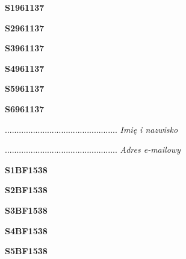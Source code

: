 \begin{turn}{90}\huge \textbf{S1961137}\end{turn}

\begin{turn}{90}\huge \textbf{S2961137}\end{turn}

\begin{turn}{90}\huge \textbf{S3961137}\end{turn}

\begin{turn}{90}\huge \textbf{S4961137}\end{turn}

\begin{turn}{90}\huge \textbf{S5961137}\end{turn}

\begin{turn}{90}\huge \textbf{S6961137}\end{turn}

\begin{turn}{90}\begin{minipage}{\linewidth} \vspace{20mm} ................................................  \textit{Imię i nazwisko}\end{minipage}\end{turn}

\begin{turn}{90}\begin{minipage}{\linewidth} \vspace{20mm} ................................................  \textit{Adres e-mailowy}\end{minipage}\end{turn}

\begin{turn}{90}\huge \textbf{S1BF1538}\end{turn}

\begin{turn}{90}\huge \textbf{S2BF1538}\end{turn}

\begin{turn}{90}\huge \textbf{S3BF1538}\end{turn}

\begin{turn}{90}\huge \textbf{S4BF1538}\end{turn}

\begin{turn}{90}\huge \textbf{S5BF1538}\end{turn}

